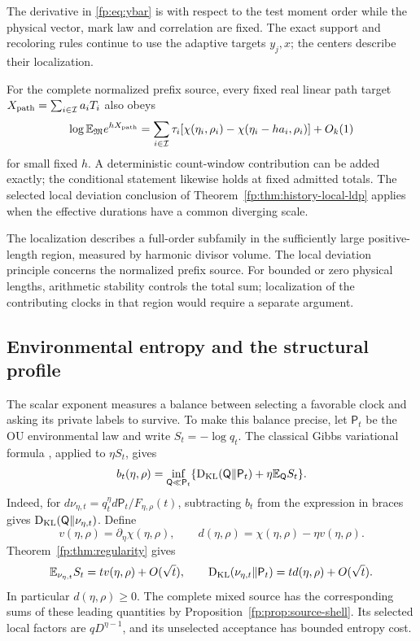 The derivative in \eqref{fp:eq:ybar} is with respect to the test
moment order while the physical vector, mark law and correlation
are fixed. The exact support and recoloring rules continue to use
the adaptive targets $y_j,x$; the centers describe their localization.

For the complete normalized prefix source, every fixed real linear
path target $X_{\rm path}=\sum_{i\in\mathcal I}a_iT_i$ also obeys
\begin{equation}
 \log\mathbb E_{\mathfrak M}e^{hX_{\rm path}}
   =\sum_{i\in\mathcal I}\tau_i
       [\chi(\eta_i,\rho_i)-\chi(\eta_i-ha_i,\rho_i)]+O_k(1)
 \label{fp:eq:source-target-spectrum}
\end{equation}
for small fixed $h$. A deterministic count-window contribution can
be added exactly; the conditional statement likewise holds at fixed
admitted totals. The selected local deviation conclusion of
Theorem~\ref{fp:thm:history-local-ldp} applies when the effective
durations have a common diverging scale.

\begin{remark}
\label{fp:rem:arithmetic-scope}
The localization describes a full-order subfamily in the sufficiently
large positive-length region, measured by harmonic divisor volume.
The local deviation principle concerns the normalized prefix source.
For bounded or zero physical lengths, arithmetic stability controls
the total sum; localization of the contributing clocks in that region
would require a separate argument.
\end{remark}

\subsection{Environmental entropy and the structural profile}
\label{fp:sec:interpretation}
The scalar exponent measures a balance between selecting a favorable
clock and asking its private labels to survive. To make this balance
precise, let $\mathsf P_t$ be the OU environmental law and write
$S_t=-\log q_t$. The classical Gibbs variational formula
\cite[Section~1.4]{DupuisEllis1997}, applied to $\eta S_t$, gives
\begin{equation}\label{fp:eq:gibbs-identity}
 b_t(\eta,\rho)=\inf_{\mathsf Q\ll\mathsf P_t}
 \{\operatorname{D_{\mathrm{KL}}}(\mathsf Q\Vert\mathsf P_t)+\eta\mathbb E_{\mathsf Q}S_t\}.
\end{equation}
Indeed, for $d\nu_{\eta,t}=q_t^\eta d\mathsf P_t/F_{\eta,\rho}(t)$,
subtracting $b_t$ from the expression in braces gives
$\operatorname{D_{\mathrm{KL}}}(\mathsf Q\Vert\nu_{\eta,t})$. Define
\begin{equation}\label{fp:eq:selection-cost}
 v(\eta,\rho)=\partial_\eta\chi(\eta,\rho),\qquad
 d(\eta,\rho)=\chi(\eta,\rho)-\eta v(\eta,\rho).
\end{equation}
Theorem~\ref{fp:thm:regularity} gives
\[
 \mathbb E_{\nu_{\eta,t}}S_t=t v(\eta,\rho)+O(\sqrt t),\qquad
 \operatorname{D_{\mathrm{KL}}}(\nu_{\eta,t}\Vert\mathsf P_t)
       =t d(\eta,\rho)+O(\sqrt t).
\]
In particular $d(\eta,\rho)\ge0$. The complete mixed source has the
corresponding sums of these leading quantities by
Proposition~\ref{fp:prop:source-shell}. Its selected local factors
are $qD^{\eta-1}$, and its unselected acceptance has bounded entropy
cost.

